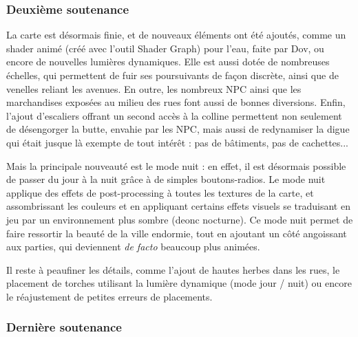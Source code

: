 \subsubsection{Deuxième soutenance}

    La carte est désormais finie, et de nouveaux éléments ont été ajoutés, comme un shader animé (créé avec l'outil Shader Graph) pour l'eau,
    faite par Dov, ou encore de nouvelles lumières dynamiques. Elle est aussi dotée de nombreuses échelles, qui permettent de fuir ses poursuivants 
    de façon discrète, ainsi que de venelles reliant les avenues.
    En outre, les nombreux NPC ainsi que les marchandises exposées au milieu des rues font aussi de bonnes diversions.
    Enfin, l'ajout d'escaliers offrant un second accès à la colline permettent non seulement de désengorger la butte, envahie par les NPC, mais aussi 
    de redynamiser la digue qui était jusque là exempte de tout intérêt : pas de bâtiments, pas de cachettes...

    Mais la principale nouveauté est le mode nuit : en effet, il est désormais possible de passer du jour à la nuit grâce à de simples boutons-radios. 
    Le mode nuit applique des effets de post-processing à toutes les textures de la carte, et assombrissant les couleurs et en appliquant certains effets 
    visuels se traduisant en jeu par un environnement plus sombre (deonc nocturne). 
    Ce mode nuit permet de faire ressortir la beauté de la ville endormie, tout en ajoutant un côté angoissant aux parties,
    qui deviennent \textit{de facto} beaucoup plus animées.

    Il reste à peaufiner les détails, comme l'ajout de hautes herbes dans les rues, le placement de torches utilisant 
    la lumière dynamique (mode jour / nuit) ou encore le réajustement de petites erreurs de placements.

\subsubsection{Dernière soutenance}




